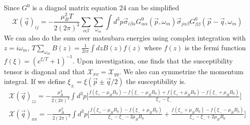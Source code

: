 \documentclass{article}
\begin{document}
Since $G^0$ is a diagnol matrix equation 24 can be simplified
\begin{equation}
\mathcal{X}(\vec{q})_{ij}=-\frac{\mu_B^2T}{2(2\pi)^3}\sum\limits_{\alpha\beta}\sum\limits_{\omega_m}\int d^3p\vec{\sigma}_{i\beta\alpha} G^0_{\alpha\alpha}(\vec{p},\omega_m) \vec{\sigma}_{j\alpha\beta}G^0_{\beta\beta}(\vec{p}-\vec{q},\omega_m)
\end{equation}
We can also do the sum over matsubara energies using complex integration with $z=i\omega_m$, $T\sum\limits_{\omega_m}B(z)=\frac{1}{2i\pi}\int dz B(z)f(z)$ where $f(z)$ is the fermi function $f(\xi)=(e^{\xi/T}+1)^{-1}$. Upon investigation, one finds that the susceptibility tensor is diagonal and that $\mathcal{X}_{xx}=\mathcal{X}_{yy}$. We also can symmetrize the momentum integral.
If we define $\xi_{\pm}=\xi(\vec{p}\pm\vec{q}/2)$ the susceptibility is.
\begin{align*}
\mathcal{X}(\vec{q})_{zz}=-\frac{\mu_B^2}{2(2\pi)^3} \int d^3p\bigg[\frac{f(\xi_+-\mu_BB_0)-f(\xi_--\mu_BB_0)+f(\xi_++\mu_BB_0)-f(\xi_-+\mu_BB_0)}{\xi_+-\xi_-}\bigg] \\ \mathcal{X}(\vec{q})_{xx}=-\frac{\mu_B^2}{2(2\pi)^3} \int d^3p\bigg[\frac{f(\xi_+-\mu_BB_0)-f(\xi_-+\mu_BB_0)}{\xi_+-\xi_--2\mu_BB_0}+\frac{f(\xi_++\mu_BB_0)-f(\xi_--\mu_BB_0)}{\xi_+-\xi_-+2\mu_BB_0}\bigg]
\end{align*}
\end{document}
